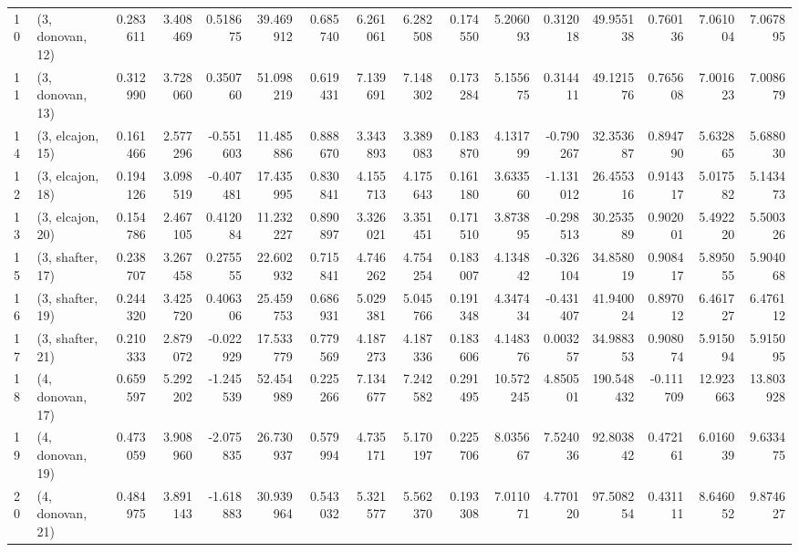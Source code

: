 \begin{tabular}{llrrrrrrrrrrrrrr}
10 &  (3, donovan, 12) &   0.283611 &  3.408469 &  0.518675 &   39.469912 &  0.685740 &   6.261061 &   6.282508 &  0.174550 &   5.206093 &  0.312018 &   49.955138 &  0.760136 &   7.061004 &   7.067895 \\
11 &  (3, donovan, 13) &   0.312990 &  3.728060 &  0.350760 &   51.098219 &  0.619431 &   7.139691 &   7.148302 &  0.173284 &   5.155675 &  0.314411 &   49.121576 &  0.765608 &   7.001623 &   7.008679 \\
14 &  (3, elcajon, 15) &   0.161466 &  2.577296 & -0.551603 &   11.485886 &  0.888670 &   3.343893 &   3.389083 &  0.183870 &   4.131799 & -0.790267 &   32.353687 &  0.894790 &   5.632865 &   5.688030 \\
12 &  (3, elcajon, 18) &   0.194126 &  3.098519 & -0.407481 &   17.435995 &  0.830841 &   4.155713 &   4.175643 &  0.161180 &   3.633560 & -1.131012 &   26.455316 &  0.914317 &   5.017582 &   5.143473 \\
13 &  (3, elcajon, 20) &   0.154786 &  2.467105 &  0.412084 &   11.232227 &  0.890897 &   3.326021 &   3.351451 &  0.171510 &   3.873895 & -0.298513 &   30.253589 &  0.902001 &   5.492220 &   5.500326 \\
15 &  (3, shafter, 17) &   0.238707 &  3.267458 &  0.275555 &   22.602932 &  0.715841 &   4.746262 &   4.754254 &  0.183007 &   4.134842 & -0.326104 &   34.858019 &  0.908417 &   5.895055 &   5.904068 \\
16 &  (3, shafter, 19) &   0.244320 &  3.425720 &  0.406306 &   25.459753 &  0.686931 &   5.029381 &   5.045766 &  0.191348 &   4.347434 & -0.431407 &   41.940024 &  0.897012 &   6.461727 &   6.476112 \\
17 &  (3, shafter, 21) &   0.210333 &  2.879072 & -0.022929 &   17.533779 &  0.779569 &   4.187273 &   4.187336 &  0.183606 &   4.148376 &  0.003257 &   34.988353 &  0.908074 &   5.915094 &   5.915095 \\
18 &  (4, donovan, 17) &   0.659597 &  5.292202 & -1.245539 &   52.454989 &  0.225266 &   7.134677 &   7.242582 &  0.291495 &  10.572245 &  4.850501 &  190.548432 & -0.111709 &  12.923663 &  13.803928 \\
19 &  (4, donovan, 19) &   0.473059 &  3.908960 & -2.075835 &   26.730937 &  0.579994 &   4.735171 &   5.170197 &  0.225706 &   8.035667 &  7.524036 &   92.803842 &  0.472161 &   6.016039 &   9.633475 \\
20 &  (4, donovan, 21) &   0.484975 &  3.891143 & -1.618883 &   30.939964 &  0.543032 &   5.321577 &   5.562370 &  0.193308 &   7.011071 &  4.770120 &   97.508254 &  0.431111 &   8.646052 &   9.874627 \\

\end{tabular}
